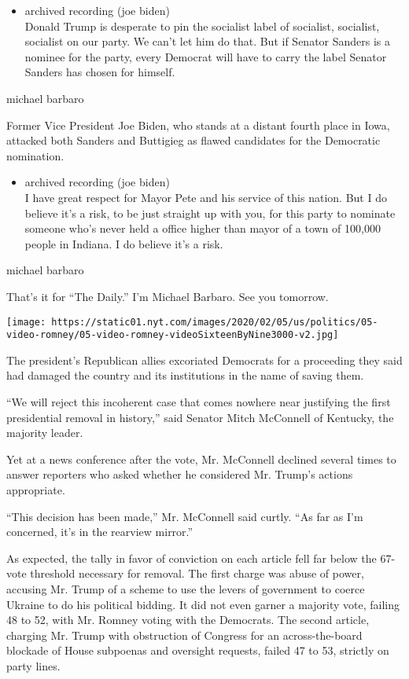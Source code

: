 \begin{itemize}
\tightlist
\item
  archived recording (joe biden)\\
  Donald Trump is desperate to pin the socialist label of socialist,
  socialist, socialist on our party. We can't let him do that. But if
  Senator Sanders is a nominee for the party, every Democrat will have
  to carry the label Senator Sanders has chosen for himself.
\end{itemize}

michael barbaro

Former Vice President Joe Biden, who stands at a distant fourth place in
Iowa, attacked both Sanders and Buttigieg as flawed candidates for the
Democratic nomination.

\begin{itemize}
\tightlist
\item
  archived recording (joe biden)\\
  I have great respect for Mayor Pete and his service of this nation.
  But I do believe it's a risk, to be just straight up with you, for
  this party to nominate someone who's never held a office higher than
  mayor of a town of 100,000 people in Indiana. I do believe it's a
  risk.
\end{itemize}

michael barbaro

That's it for ``The Daily.'' I'm Michael Barbaro. See you tomorrow.

\texttt{[image: https://static01.nyt.com/images/2020/02/05/us/politics/05-video-romney/05-video-romney-videoSixteenByNine3000-v2.jpg]}

The president's Republican allies excoriated Democrats for a proceeding
they said had damaged the country and its institutions in the name of
saving them.

``We will reject this incoherent case that comes nowhere near justifying
the first presidential removal in history,'' said Senator Mitch
McConnell of Kentucky, the majority leader.

Yet at a news conference after the vote, Mr. McConnell declined several
times to answer reporters who asked whether he considered Mr. Trump's
actions appropriate.

``This decision has been made,'' Mr. McConnell said curtly. ``As far as
I'm concerned, it's in the rearview mirror.''

As expected, the tally in favor of conviction on each article fell far
below the 67-vote threshold necessary for removal. The first charge was
abuse of power, accusing Mr. Trump of a scheme to use the levers of
government to coerce Ukraine to do his political bidding. It did not
even garner a majority vote, failing 48 to 52, with Mr. Romney voting
with the Democrats. The second article, charging Mr. Trump with
obstruction of Congress for an across-the-board blockade of House
subpoenas and oversight requests, failed 47 to 53, strictly on party
lines.

